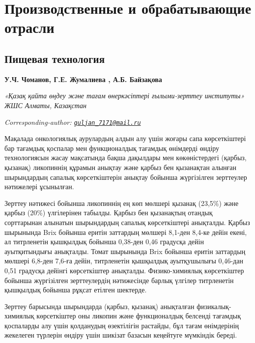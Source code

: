 \newpage
\let\cleardoublepage\clearpage
\part{Производственные и обрабатывающие отрасли}
\chapter{Пищевая технология}

\begin{articleheader}

{\bfseries У.Ч. Чоманов\authorid,
Г.Е. Жумалиева\textsuperscript{\envelope } \authorid,
А.Б. Байзақова\authorid}
\end{articleheader}

\begin{affiliation}
\emph{«Қазақ қайта өңдеу және тағам өнеркәсіптері ғылыми-зерттеу институты» ЖШС Алматы, Казақстан}

\raggedright \textsuperscript{\envelope }{\em Corresponding-author: \href{mailto:guljan_7171@mail.ru}{\nolinkurl{guljan\_7171@mail.ru}}}
\end{affiliation}

Мақалада онкологиялық аурулардың алдын алу үшін жоғары сапа
көрсеткіштері бар тағамдық қоспалар мен функционалдық тағамдық өнімдерді
өндіру технологиясын жасау мақсатында бақша дақылдары мен көкөністердегі
(қарбыз, қызанақ) ликопиннің құрамын анықтау және қарбыз бен қызанақтан
алынған шырындардың сапалық көрсеткіштерін анықтау бойынша жүргізілген
зерттеулер нәтижелері ұсынылған.

Зерттеу нәтижесі бойынша ликопиннің ең көп мөлшері қызанақ (23,5\%) және
қарбыз (20\%) үлгілерінен табылды. Қарбыз бен қызанақтың отандық
сорттарынан алынатын шырындардың сапалық көрсеткіштері анықталды. Қарбыз
шырынында Brix бойынша еритін заттардың мөлшері 8,1-ден 8,4-ке дейін
екені, ал титрленетін қышқылдық бойынша 0,38-ден 0,46 градусқа дейін
ауытқитындығы анықталды. Томат шырынында Brix бойынша еритін заттардың
мөлшері 6,8-ден 7,6-ға дейін, титрленетін қышқылдық ауытқушылығы
0,46-дан 0,51 градусқа дейінгі көрсеткіштер анықталды. Физико-химиялық
көрсеткіштер бойынша жүргізілген зерттеулердің нәтижесінде барлық
үлгілер титрленетін қышқылдық бойынша рұқсат етілген шектерде.

Зерттеу барысында шырындарда (қарбыз, қызанақ) анықталған
физикалық-химиялық көрсеткіштер оны ликопин және функционалдық белсенді
тағамдық қоспаларды алу үшін қолданудың өзектілігін растайды, бұл тағам
өнімдерінің жекелеген түрлерін өндіру үшін шикізат базасын кеңейтуге
мүмкіндік береді.

